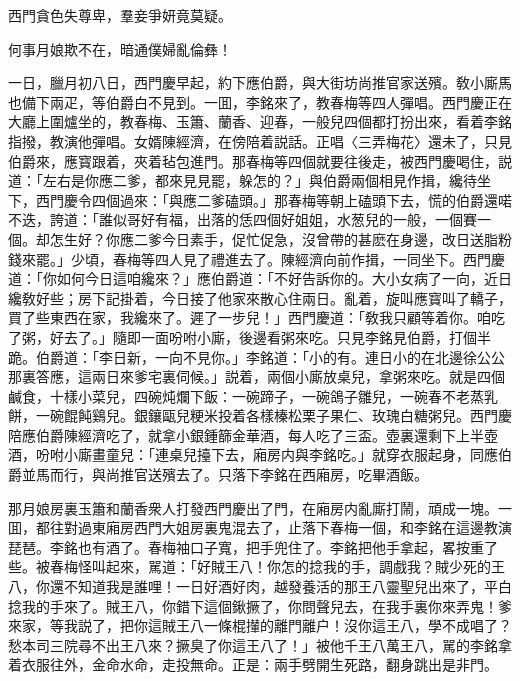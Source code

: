 西門貪色失尊卑，羣妾爭妍竟莫疑。

何事月娘欺不在，暗通僕婦亂倫彝！

一日，臘月初八日，西門慶早起，約下應伯爵，與大街坊尚推官家送殯。敎小廝馬也備下兩疋，等伯爵白不見到。一囬，李銘來了，教春梅等四人彈唱。西門慶正在大廳上圍爐坐的，教春梅、玉簫、蘭香、迎春，一般兒四個都打扮出來，看着李銘指撥，教演他彈唱。女婿陳經濟，在傍陪着説話。正唱〈三弄梅花〉還未了，只見伯爵來，應寳跟着，夾着毡包進門。那春梅等四個就要往後走，被西門慶喝住，説道：「左右是你應二爹，都來見見罷，躲怎的？」與伯爵兩個相見作揖，纔待坐下，西門慶令四個過來：「與應二爹磕頭。」那春梅等朝上磕頭下去，慌的伯爵還喏不迭，誇道：「誰似哥好有福，出落的恁四個好姐姐，水葱兒的一般，一個賽一個。却怎生好？你應二爹今日素手，促忙促急，沒曾帶的甚麽在身邊，改日送脂粉錢來罷。」少頃，春梅等四人見了禮進去了。陳經濟向前作揖，一同坐下。西門慶道：「你如何今日這咱纔來？」應伯爵道：「不好告訴你的。大小女病了一向，近日纔敎好些；房下記掛着，今日接了他家來散心住兩日。亂着，旋叫應寳叫了轎子，買了些東西在家，我纔來了。遲了一步兒！」西門慶道：「敎我只顧等着你。咱吃了粥，好去了。」隨即一面吩咐小廝，後邊看粥來吃。只見李銘見伯爵，打個半跪。伯爵道：「李日新，一向不見你。」李銘道：「小的有。連日小的在北邊徐公公那裏答應，這兩日來爹宅裏伺候。」説着，兩個小廝放桌兒，拿粥來吃。就是四個鹹食，十樣小菜兒，四碗炖爛下飯：一碗蹄子，一碗鴿子雛兒，一碗春不老蒸乳餅，一碗餛飩鷄兒。銀鑲甌兒粳米投着各樣榛松栗子果仁、玫瑰白糖粥兒。西門慶陪應伯爵陳經濟吃了，就拿小銀鍾篩金華酒，每人吃了三盃。壺裏還剩下上半壺酒，吩咐小廝畫童兒：「連桌兒擡下去，廂房内與李銘吃。」就穿衣服起身，同應伯爵並馬而行，與尚推官送殯去了。只落下李銘在西廂房，吃畢酒飯。

那月娘房裏玉簫和蘭香衆人打發西門慶出了門，在廂房内亂廝打鬧，頑成一塊。一囬，都往對過東廂房西門大姐房裏鬼混去了，止落下春梅一個，和李銘在這邊教演琵琶。李銘也有酒了。春梅袖口子寬，把手兜住了。李銘把他手拿起，畧按重了些。被春梅怪叫起來，駡道：「好賊王八！你怎的捻我的手，調戲我？賊少死的王八，你還不知道我是誰哩！一日好酒好肉，越發養活的那王八靈聖兒出來了，平白捻我的手來了。賊王八，你錯下這個鍬撅了，你問聲兒去，在我手裏你來弄鬼！爹來家，等我説了，把你這賊王八一條棍攆的離門離户！沒你這王八，學不成唱了？愁本司三院尋不出王八來？撅臭了你這王八了！」被他千王八萬王八，駡的李銘拿着衣服往外，金命水命，走投無命。正是：兩手劈開生死路，翻身跳出是非門。

